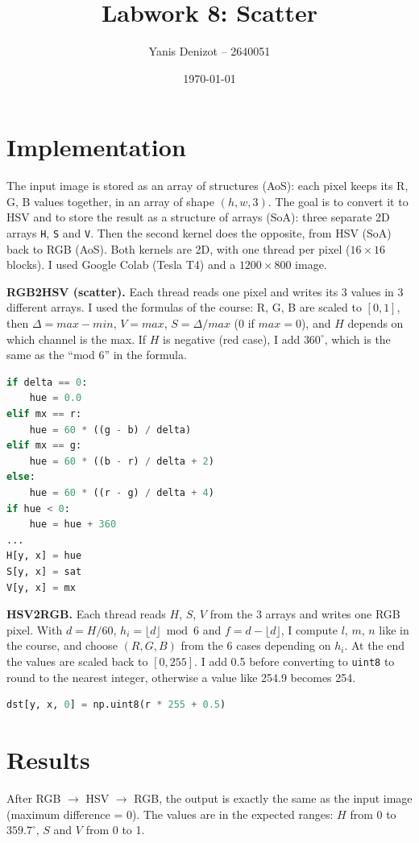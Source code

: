\documentclass[11pt,a4paper]{article}
\title{Labwork 8: Scatter}
\author{Yanis Denizot -- 2640051}
\date{\today}
\begin{document}
\maketitle

\section{Implementation}
The input image is stored as an array of structures (AoS): each pixel keeps its R, G, B values
together, in an array of shape $(h, w, 3)$. The goal is to convert it to HSV and to store the
result as a structure of arrays (SoA): three separate 2D arrays \texttt{H}, \texttt{S} and
\texttt{V}. Then the second kernel does the opposite, from HSV (SoA) back to RGB (AoS).
Both kernels are 2D, with one thread per pixel ($16 \times 16$ blocks). I used Google Colab
(Tesla T4) and a $1200 \times 800$ image.

\textbf{RGB2HSV (scatter).} Each thread reads one pixel and writes its 3 values in 3 different
arrays. I used the formulas of the course: R, G, B are scaled to $[0, 1]$, then
$\Delta = max - min$, $V = max$, $S = \Delta / max$ (0 if $max = 0$), and $H$ depends on which
channel is the max. If $H$ is negative (red case), I add $360^\circ$, which is the same as the
``mod 6'' in the formula.
\begin{lstlisting}[language=Python]
if delta == 0:
    hue = 0.0
elif mx == r:
    hue = 60 * ((g - b) / delta)
elif mx == g:
    hue = 60 * ((b - r) / delta + 2)
else:
    hue = 60 * ((r - g) / delta + 4)
if hue < 0:
    hue = hue + 360
...
H[y, x] = hue
S[y, x] = sat
V[y, x] = mx
\end{lstlisting}

\textbf{HSV2RGB.} Each thread reads $H$, $S$, $V$ from the 3 arrays and writes one RGB pixel.
With $d = H / 60$, $h_i = \lfloor d \rfloor \bmod 6$ and $f = d - \lfloor d \rfloor$, I compute
$l$, $m$, $n$ like in the course, and choose $(R, G, B)$ from the 6 cases depending on $h_i$.
At the end the values are scaled back to $[0, 255]$. I add 0.5 before converting to
\texttt{uint8} to round to the nearest integer, otherwise a value like 254.9 becomes 254.
\begin{lstlisting}[language=Python]
dst[y, x, 0] = np.uint8(r * 255 + 0.5)
\end{lstlisting}

\section{Results}
After RGB $\rightarrow$ HSV $\rightarrow$ RGB, the output is exactly the same as the input
image (maximum difference = 0). The values are in the expected ranges: $H$ from 0 to
$359.7^\circ$, $S$ and $V$ from 0 to 1.
\end{document}
